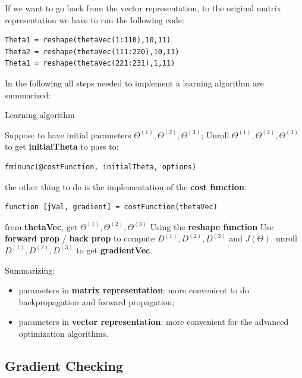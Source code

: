 If we want to go back from the vector representation, to the original matrix representation we have to run the following code:

\begin{mdframed}[style=MyFrame]
\begin{lstlisting}
Theta1 = reshape(thetaVec(1:110),10,11)
Theta2 = reshape(thetaVec(111:220),10,11)
Theta1 = reshape(thetaVec(221:231),1,11)
\end{lstlisting}
\end{mdframed}


In the following all steps needed to implement a learning algorithm are summarized:

\begin{algorithm}[H]
\footnotesize
\caption{Learning algorithm}
\label{learnalg}
\begin{algorithmic}[1]
\State Suppose to have initial parameters $\Theta^{(1)}, \Theta^{(2)}, \Theta^{(3)}$;  %
\State Unroll $\Theta^{(1)}, \Theta^{(2)}, \Theta^{(3)}$ to get {\bf initialTheta} to pass to: 
\begin{lstlisting}
fminunc(@costFunction, initialTheta, options)  
\end{lstlisting}
\State the other thing to do is the implementation of the {\bf cost function}:
\begin{lstlisting}
function [jVal, gradient] = costFunction(thetaVec)
\end{lstlisting}
\State from {\bf thetaVec}, get $\Theta^{(1)}, \Theta^{(2)}, \Theta^{(3)}$ \Comment Using the {\bf reshape function}
\State Use {\bf forward prop} / {\bf back prop} to compute $D^{(1)}, D^{(2)}, D^{(3)}$ and $J(\Theta)$.
\State unroll $D^{(1)}, D^{(2)}, D^{(3)}$ to get {\bf gradientVec}.
\end{algorithmic}
\end{algorithm}

Summarizing:

\begin{itemize}
\item parameters in {\bf matrix representation}: more convenient to do backpropagation and forward propagation;
\item parameters in {\bf vector representation}: more convenient for the advanced optimization algorithms.
\end{itemize}


\subsection{Gradient Checking}

